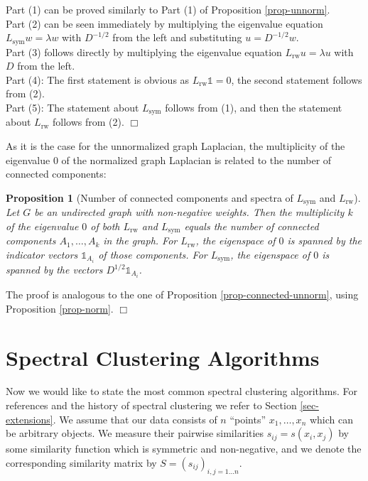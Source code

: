 \documentclass{article}
\newtheorem{proposition}[lemma]{Proposition}
\newenvironment{proof}{\par\noindent{\em Proof. }}{\hfill$\Box$\\[2mm]}
\newcommand{\charfct}{\mathbb{1}}
\newcommand{\Lsym}{L_{\text{sym}}}
\newcommand{\Lrw}{L_{\text{rw}}}
\begin{document}
%
\begin{proof}
Part (1) can be proved similarly to Part (1) of Proposition
\ref{prop-unnorm}. \\
Part (2) can be seen immediately by multiplying the eigenvalue
equation $\Lsym w = \lambda w$ with $D^{-1/2}$ from the left and
substituting $u = D^{-1/2}w$. \\
Part (3) follows directly by multiplying the eigenvalue equation $\Lrw
u = \lambda u$ with $D$ from the left. \\
Part (4): The first statement is obvious as $\Lrw \charfct = 0$, the second statement follows from (2). \\
Part (5): The statement about $\Lsym$ follows from (1),
and then the statement about $\Lrw$ follows from (2). 
\end{proof}
%


As it is the case for the unnormalized graph Laplacian, the
multiplicity of the eigenvalue 0 of the normalized graph Laplacian is
related to the number of connected components: 

%
\begin{proposition}[Number of connected components and spectra of $\Lsym$ and $\Lrw$]
  \label{prop-connected-norm} Let $G$ be an undirected graph with
  non-negative weights. Then the multiplicity $k$ of the eigenvalue
  $0$ of both $\Lrw$ and $\Lsym$ equals the number of connected
  components $A_1, \hdots, A_k$ in the graph. For $\Lrw$, the eigenspace of $0$ is
  spanned by the indicator vectors $\charfct_{A_i}$ of those
  components. For $\Lsym$, the eigenspace of $0$ is spanned by the
  vectors   $D^{1/2} \charfct_{A_i}$. 
\end{proposition}
%
%
\begin{proof} The proof is analogous to the one of Proposition
  \ref{prop-connected-unnorm}, using Proposition \ref{prop-norm}. 
\end{proof}
%

%
\section{Spectral Clustering Algorithms} \label{sec-algorithms}
%

Now we would like to state the most common spectral clustering
algorithms. For references and the history of spectral clustering
we refer to Section \ref{sec-extensions}. We assume that our data consists of $n$ ``points'' 
$x_1,\hdots,x_n$ which can be arbitrary objects. We measure their pairwise
similarities $s_{ij} = s(x_i,x_j)$ by some
similarity function which is symmetric and non-negative, and we denote the
corresponding similarity matrix by $S = (s_{ij})_{i,j=1 \hdots n}$.
\end{document}
